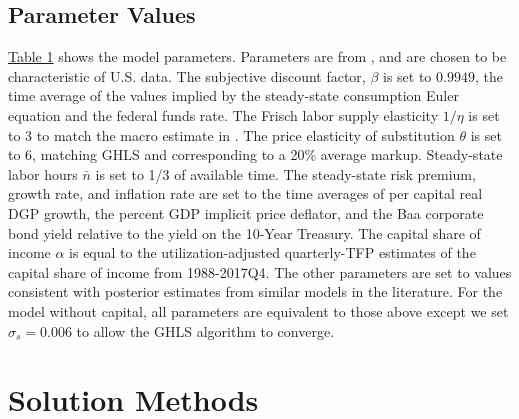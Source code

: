 \documentclass[12pt, final]{article}
\begin{document}
\subsection{Parameter Values} \hyperlink{Table 1}{Table 1} shows the model parameters. Parameters are from \hyperlink{Atkinson}{\color{black}{Atkinson et al.\ (2019)}}, and are chosen to be characteristic of U.S. data. The subjective discount factor, $\beta$ is set to $0.9949$, the time average of the values implied by the steady-state consumption Euler equation and the federal funds rate. The Frisch labor supply elasticity $1/\eta$ is set to 3 to match the macro estimate in \hyperlink{Peterman}{\color{black}{Peterman (2016)}}. The price elasticity of substitution $\theta$ is set to 6, matching GHLS and corresponding to a 20\% average markup. Steady-state labor hours $\bar{n}$ is set to 1/3 of available time. The steady-state risk premium, growth rate, and inflation rate are set to the time averages of per capital real DGP growth, the percent GDP implicit price deflator, and the Baa corporate bond yield relative to the yield on the 10-Year Treasury. The capital share of income $\alpha$ is equal to the \hyperlink{Fernald}{\color{black}{Fernald (2012)}} utilization-adjusted quarterly-TFP estimates of the capital share of income from 1988-2017Q4. The other parameters are set to values consistent with posterior estimates from similar models in the literature. For the model without capital, all parameters are equivalent to those above except we set $\sigma_s=0.006$ to allow the GHLS algorithm to converge.

\section[Section 3]{Solution Methods \hypertarget{Section 3}{}} 
\end{document}
